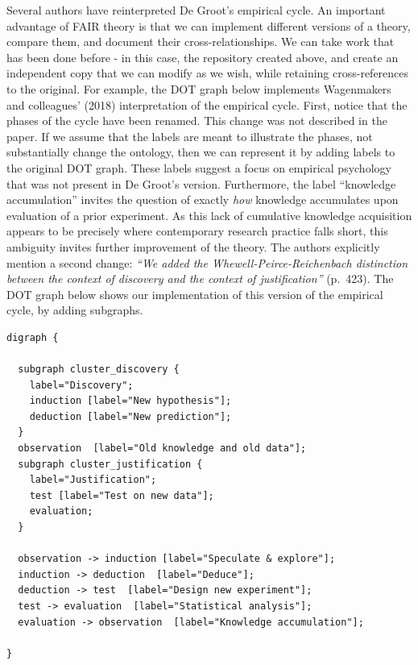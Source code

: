 \documentclass[
  man, noextraspace,floatsintext]{apa7}
\begin{document}
Several authors have reinterpreted De Groot's empirical cycle.
An important advantage of FAIR theory is that we can implement different versions of a theory, compare them, and document their cross-relationships.
We can take work that has been done before - in this case, the repository created above, and create an independent copy that we can modify as we wish, while retaining cross-references to the original.
For example, the DOT graph below implements Wagenmakers and colleagues' (2018) interpretation of the empirical cycle.
First, notice that the phases of the cycle have been renamed.
This change was not described in the paper.
If we assume that the labels are meant to illustrate the phases,
not substantially change the ontology,
then we can represent it by adding labels to the original DOT graph.
These labels suggest a focus on empirical psychology that was not present in De Groot's version.
Furthermore, the label ``knowledge accumulation'' invites the question of exactly \emph{how} knowledge accumulates upon evaluation of a prior experiment.
As this lack of cumulative knowledge acquisition appears to be precisely where contemporary research practice falls short, this ambiguity invites further improvement of the theory.
The authors explicitly mention a second change: \emph{``We added the Whewell-Peirce-Reichenbach distinction between the context of discovery and the context of justification''} (p.~423).
The DOT graph below shows our implementation of this version of the empirical cycle, by adding subgraphs.

\begin{verbatim}
digraph {

  subgraph cluster_discovery {
    label="Discovery";
    induction [label="New hypothesis"];
    deduction [label="New prediction"];
  }
  observation  [label="Old knowledge and old data"];
  subgraph cluster_justification {
    label="Justification";
    test [label="Test on new data"];
    evaluation;
  }

  observation -> induction [label="Speculate & explore"];
  induction -> deduction  [label="Deduce"];
  deduction -> test  [label="Design new experiment"];
  test -> evaluation  [label="Statistical analysis"];
  evaluation -> observation  [label="Knowledge accumulation"];

}
\end{verbatim}
\end{document}
